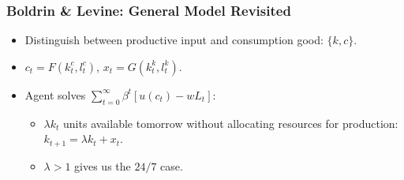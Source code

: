 \documentclass{beamer}
\begin{document}
\begin{frame}
  \frametitle{Boldrin \& Levine: General Model Revisited}
  \begin{itemize}
    \item<+-> Distinguish between productive input and consumption good: $\{k,c\}$.
    \item<+-> $c_t = F(k_t^c,l_t^c)$, $x_t = G(k_t^k,l_t^k)$.
    \item<+-> Agent solves $\sum_{t=0}^\infty\beta^t[u(c_t)-wL_t]$:
    \begin{itemize}
      \item<+-> $\lambda k_t$ units available tomorrow without allocating resources for production: $k_{t+1} = \lambda k_t + x_t$.
      \item<+-> $\lambda > 1$ gives us the $24/7$ case.
    \end{itemize}
  \end{itemize}
\end{frame}
\end{document}
